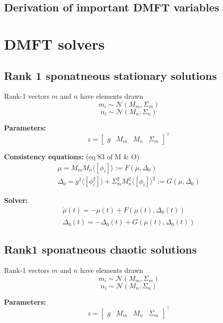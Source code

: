 \documentclass[11pt]{article}
\begin{document}
\subsection{Derivation of important DMFT variables}

\section{DMFT solvers}

\subsection{Rank 1 sponatneous stationary solutions}
Rank-1 vectors $m$ and $n$ have elements drawn
\[m_i \sim \mathcal{N}(M_m, \Sigma_m)\]
\[n_i \sim \mathcal{N}(M_n, \Sigma_n)\]

\textbf{Parameters:} \\
\[z = \begin{bmatrix} g & M_m & M_n & \Sigma_m \end{bmatrix}^\top \]

\textbf{Consistency equations:} (eq 83 of M \& O) \\\begin{equation}
\begin{split}
\mu = M_m M_n \langle \left[ \phi_i \right] \rangle := F(\mu, \Delta_0) \\
\Delta_0 = g^2 \langle \left[ \phi_i^2 \right] \rangle + \Sigma_m^2 M_n^2 \langle \left[ \phi_i \right] \rangle^2 := G(\mu, \Delta_0)
\end{split}
\end{equation}

\textbf{Solver:}
\begin{equation}
\begin{split}
\dot{\mu}(t) = -\mu(t) + F(\mu(t), \Delta_0(t)) \\
\dot{\Delta_0}(t) = -\Delta_0(t) + G(\mu(t), \Delta_0(t))
\end{split}
\end{equation}

\subsection{Rank1 sponatneous chaotic solutions}
Rank-1 vectors $m$ and $n$ have elements drawn
\[m_i \sim \mathcal{N}(M_m, \Sigma_m)\]
\[n_i \sim \mathcal{N}(M_n, \Sigma_n)\]

\textbf{Parameters:} \\
\[z = \begin{bmatrix} g & M_m & M_n & \Sigma_m \end{bmatrix}^\top \]
\end{document}
